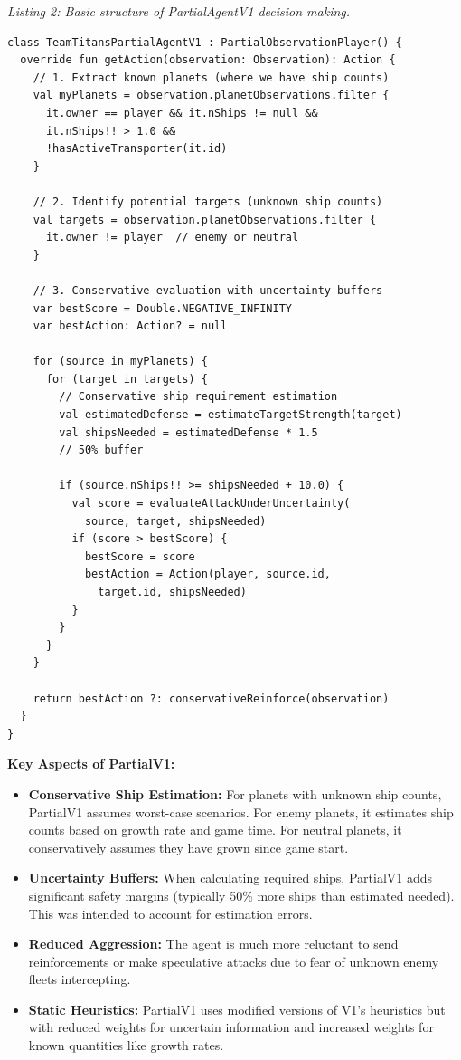 \documentclass[conference]{IEEEtran}
\begin{document}
\textit{Listing 2: Basic structure of PartialAgentV1 decision making.}

\begin{scriptsize}
\raggedright
\begin{verbatim}
class TeamTitansPartialAgentV1 : PartialObservationPlayer() {
  override fun getAction(observation: Observation): Action {
    // 1. Extract known planets (where we have ship counts)
    val myPlanets = observation.planetObservations.filter {
      it.owner == player && it.nShips != null && 
      it.nShips!! > 1.0 && 
      !hasActiveTransporter(it.id)
    }
    
    // 2. Identify potential targets (unknown ship counts)
    val targets = observation.planetObservations.filter {
      it.owner != player  // enemy or neutral
    }
    
    // 3. Conservative evaluation with uncertainty buffers
    var bestScore = Double.NEGATIVE_INFINITY
    var bestAction: Action? = null
    
    for (source in myPlanets) {
      for (target in targets) {
        // Conservative ship requirement estimation
        val estimatedDefense = estimateTargetStrength(target)
        val shipsNeeded = estimatedDefense * 1.5  
        // 50% buffer
        
        if (source.nShips!! >= shipsNeeded + 10.0) {
          val score = evaluateAttackUnderUncertainty(
            source, target, shipsNeeded)
          if (score > bestScore) {
            bestScore = score
            bestAction = Action(player, source.id, 
              target.id, shipsNeeded)
          }
        }
      }
    }
    
    return bestAction ?: conservativeReinforce(observation)
  }
}
\end{verbatim}
\end{scriptsize}

\textbf{Key Aspects of PartialV1:}

\begin{itemize}
\item \textbf{Conservative Ship Estimation:} For planets with unknown ship counts, PartialV1 assumes worst-case scenarios. For enemy planets, it estimates ship counts based on growth rate and game time. For neutral planets, it conservatively assumes they have grown since game start.

\item \textbf{Uncertainty Buffers:} When calculating required ships, PartialV1 adds significant safety margins (typically 50\% more ships than estimated needed). This was intended to account for estimation errors.

\item \textbf{Reduced Aggression:} The agent is much more reluctant to send reinforcements or make speculative attacks due to fear of unknown enemy fleets intercepting.

\item \textbf{Static Heuristics:} PartialV1 uses modified versions of V1's heuristics but with reduced weights for uncertain information and increased weights for known quantities like growth rates.
\end{itemize}
\end{document}
